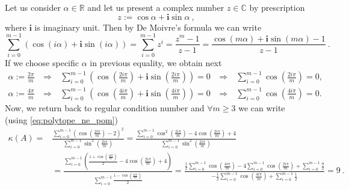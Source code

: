 \documentclass{article}
\theoremstyle{definition}
\begin{document}
\noindent Let us consider $\alpha \in \mathbb{R}$ and let us present a complex number $z \in \mathbb{C}$ by prescription
\begin{displaymath}
 z := \cos \alpha + \mathbf{i} \sin \alpha ~\mathrm{,}
\end{displaymath}
where $\mathbf{i}$ is imaginary unit. Then by De Moivre's formula we can write
\begin{displaymath}
 \sum\limits_{i=0}^{m-1} \left( \cos ( i\alpha) + \mathbf{i} \sin ( i \alpha) \right) =
 \sum\limits_{i=0}^{m-1} z^i =
 \frac{z^m - 1}{z - 1} =
 \frac{\cos (m\alpha) + \mathbf{i} \sin (m\alpha) - 1}{z-1} ~\mathrm{.}
\end{displaymath}
If we choose specific $\alpha$ in previous equality, we obtain next
\begin{equation}
 \label{eq:polytope_ne_pom}
  \begin{array}{ccccc}
   \alpha := \frac{2 \pi}{m}& ~ \Rightarrow ~ & \sum\limits_{i=0}^{m-1} \left( \cos \left( \frac{2i\pi}{m} \right) + \mathbf{i} \sin \left( \frac{2i\pi}{m} \right) \right) = 0 & ~ \Rightarrow ~ & \sum\limits_{i=0}^{m-1} \cos \left( \frac{2i\pi}{m} \right) = 0\mathrm{,}\\ 
   \alpha := \frac{4 \pi}{m}& ~ \Rightarrow ~ & \sum\limits_{i=0}^{m-1} \left( \cos \left( \frac{4i\pi}{m} \right) + \mathbf{i} \sin \left( \frac{4i\pi}{m} \right) \right) = 0 & ~ \Rightarrow ~ & \sum\limits_{i=0}^{m-1} \cos \left( \frac{4i\pi}{m} \right) = 0\mathrm{.}
  \end{array}
\end{equation}
Now, we return back to regular condition number and $\forall m \geq 3$ we can write (using \eqref{eq:polytope_ne_pom})
\begin{displaymath} 
 \begin{array}{rl}
   \kappa (A) = & \frac{\sum\limits_{i=0}^{m-1} \left( \cos \left( \frac{2i\pi}{m} \right) - 2 \right)^2}{\sum\limits_{i=0}^{m-1} \sin^2 \left( \frac{2i\pi}{m} \right)} 
= \frac{\sum\limits_{i=0}^{m-1} \cos^2 \left( \frac{2i\pi}{m} \right) - 4 \cos \left( \frac{2i\pi}{m} \right) + 4}{\sum\limits_{i=0}^{m-1} \sin^2 \left( \frac{2i\pi}{m} \right)} \\
 & = \frac{\sum\limits_{i=0}^{m-1} \left( \frac{1 + \cos \left( \frac{4i\pi}{m} \right)}{2} - 4 \cos \left( \frac{2i\pi}{m} \right) + 4 \right)}{\sum\limits_{i=0}^{m-1} 
  \frac{1 - \cos \left( \frac{4i\pi}{m} \right)}{2}} 
 =  \frac{ \frac{1}{2} \sum\limits_{i=0}^{m-1} \cos \left( \frac{4i\pi}{m} \right) - 4 \sum\limits_{i=0}^{m-1} \cos \left( \frac{2i\pi}{m} \right) + \sum\limits_{i=0}^{m-1} \frac{9}{2}   }{-\frac{1}{2}\sum\limits_{i=0}^{m-1} \cos \left( \frac{4i\pi}{m} \right) + \sum\limits_{i=0}^{m-1} \frac{1}{2} } = 9 ~\mathrm{.}
 \end{array} 
\end{displaymath}
\end{document}
